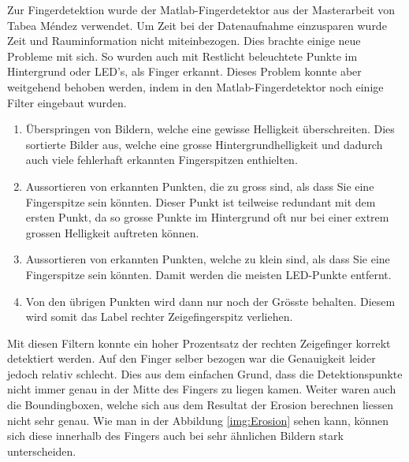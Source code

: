 Zur Fingerdetektion wurde der Matlab-Fingerdetektor aus der Masterarbeit von Tabea Méndez \cite{TabeasFingertracking} verwendet. 
Um Zeit bei der Datenaufnahme einzusparen wurde Zeit und Rauminformation nicht miteinbezogen. 
Dies brachte einige neue Probleme mit sich.   
So wurden auch mit Restlicht beleuchtete Punkte im Hintergrund oder LED's, als Finger erkannt.
Dieses Problem konnte aber weitgehend behoben werden, indem in den Matlab-Fingerdetektor noch einige Filter eingebaut wurden.
\begin{enumerate}
\item Überspringen von Bildern, welche eine gewisse Helligkeit überschreiten. 
Dies sortierte Bilder aus, welche eine grosse Hintergrundhelligkeit und dadurch auch viele fehlerhaft erkannten Fingerspitzen enthielten.  
\item Aussortieren von erkannten Punkten, die zu gross sind, als dass Sie eine Fingerspitze sein könnten. 
Dieser Punkt ist teilweise redundant mit dem ersten Punkt, da so grosse Punkte im Hintergrund oft nur bei einer extrem grossen Helligkeit auftreten können.  
\item Aussortieren von erkannten Punkten, welche zu klein sind, als dass Sie eine Fingerspitze sein könnten. 
Damit werden die meisten LED-Punkte entfernt.
\item Von den übrigen Punkten wird dann nur noch der Grösste behalten.
Diesem wird somit das Label \grqq{}rechter Zeigefingerspitz\grqq{} verliehen. 
\end{enumerate}
Mit diesen Filtern konnte ein hoher Prozentsatz der rechten Zeigefinger korrekt detektiert werden.
Auf den Finger selber bezogen war die Genauigkeit leider jedoch relativ schlecht.
Dies aus dem einfachen Grund, dass die Detektionspunkte nicht immer genau in der Mitte des Fingers zu liegen kamen. 
Weiter waren auch die Boundingboxen, welche sich aus dem Resultat der Erosion \cite{TabeasFingertracking} berechnen liessen nicht sehr genau. 
Wie man in der Abbildung \ref{img:Erosion} sehen kann, können sich diese innerhalb des Fingers auch bei sehr ähnlichen Bildern stark unterscheiden.

